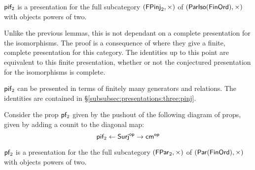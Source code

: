 

\begin{lemma}
\label{lem:parisof}
$\mathsf{p}\mathsf{i} \mathsf{f}_2$ is a presentation for the full subcategory $(\mathsf{FPinj}_2,\times)$ of $(\mathsf{ParIso}(\mathsf{FinOrd}),\times)$ with objects powers of two.
\end{lemma}

Unlike the previous lemmas, this is not dependant on a complete presentation for the isomorphisms.
The proof is a consequence of \cite[Thm 7.6.14]{cole} where they give a finite, complete presentation for this category.  The identities up to this point are equivalent to this finite presentation, whether or not the conjectured presentation for the isomorphisms is complete.

$\mathsf{p}\mathsf{i} \mathsf{f}_2$ can be presented in terms of finitely many generators and relations.  The identities are contained in \S \ref{subsubsec:presentations:three:pinj}.

\begin{definition}

Consider the prop $\mathsf{p}\mathsf{f}_2$ given by the  pushout of the following diagram of props, given by adding a counit to the diagonal map:
$$\mathsf{p}\mathsf{i}\mathsf{f}_2 \leftarrow {\sf Surj}^{\mathsf{op}} \rightarrow {\sf cm}^{\mathsf{op}}$$

\end{definition}


\begin{lemma}
\label{lem:parand}
$\mathsf{p}\mathsf{f}_2$ is a presentation for the the full subcategory $(\mathsf{FPar}_2,\times)$ of $(\mathsf{Par}(\mathsf{FinOrd}),\times)$ with objects powers of two.
\end{lemma}

